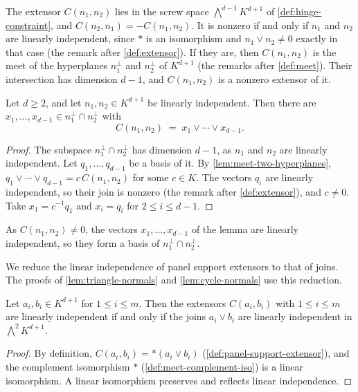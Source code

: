 The extensor $C(n_1, n_2)$ lies in the screw space
$\bigwedge^{d-1} K^{d+1}$ of \cref{def:hinge-constraint}, and
$C(n_2, n_1) = -C(n_1, n_2)$. It is nonzero if and only if $n_1$ and
$n_2$ are linearly independent, since $*$ is an isomorphism and
$n_1 \vee n_2 \neq 0$ exactly in that case (the remark after
\cref{def:extensor}). If they are, then $C(n_1, n_2)$ is the meet of the
hyperplanes $n_1^\perp$ and $n_2^\perp$ of $K^{d+1}$ (the remarks after
\cref{def:meet}). Their intersection has dimension $d - 1$, and
$C(n_1, n_2)$ is a nonzero extensor of it.

\begin{lemma}
  \label{lem:panel-support-extensor-join}
  \leanok
  Let $d \ge 2$, and let $n_1, n_2 \in K^{d+1}$ be linearly independent.
  Then there are $x_1, \dots, x_{d-1} \in n_1^\perp \cap n_2^\perp$ with
  \[
    C(n_1, n_2) \;=\; x_1 \vee \cdots \vee x_{d-1}.
  \]
\end{lemma}
\begin{proof}
  \leanok
  The subspace $n_1^\perp \cap n_2^\perp$ has dimension $d - 1$, as $n_1$
  and $n_2$ are linearly independent. Let $q_1, \dots, q_{d-1}$ be a basis
  of it. By \cref{lem:meet-two-hyperplanes},
  $q_1 \vee \cdots \vee q_{d-1} = c\, C(n_1, n_2)$ for some $c \in K$. The
  vectors $q_i$ are linearly independent, so their join is nonzero (the
  remark after \cref{def:extensor}), and $c \neq 0$. Take
  $x_1 = c^{-1} q_1$ and $x_i = q_i$ for $2 \le i \le d - 1$.
\end{proof}

As $C(n_1, n_2) \neq 0$, the vectors $x_1, \dots, x_{d-1}$ of the lemma
are linearly independent, so they form a basis of
$n_1^\perp \cap n_2^\perp$.

We reduce the linear independence of panel support extensors to that of
joins. The proofs of \cref{lem:triangle-normals} and
\cref{lem:cycle-normals} use this reduction.

\begin{lemma}
  \label{lem:panel-support-extensor-independence}
  \leanok
  Let $a_i, b_i \in K^{d+1}$ for $1 \le i \le m$. Then the extensors
  $C(a_i, b_i)$ with $1 \le i \le m$ are linearly independent if and
  only if the joins $a_i \vee b_i$ are linearly independent in
  $\bigwedge^2 K^{d+1}$.
\end{lemma}
\begin{proof}
  \leanok
  By definition, $C(a_i, b_i) = *(a_i \vee b_i)$
  (\cref{def:panel-support-extensor}), and the complement isomorphism $*$
  (\cref{def:meet-complement-iso}) is a linear isomorphism. A linear
  isomorphism preserves and reflects linear independence.
\end{proof}


